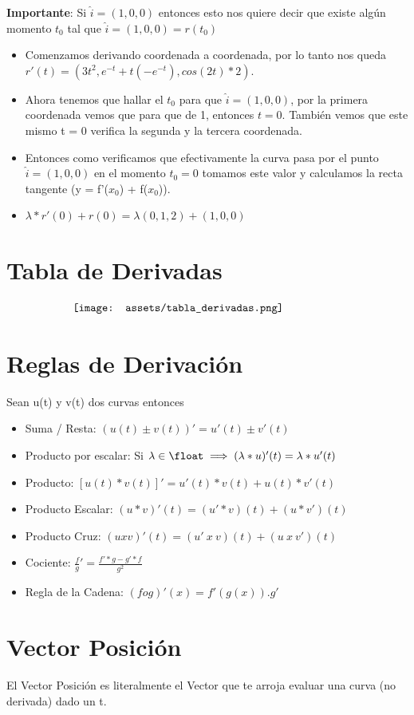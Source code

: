 \documentclass[10pt,a4paper]{article}
\begin{document}
\textbf{Importante}: Si $\hat{i} = (1, 0, 0)$ entonces esto nos quiere decir que existe algún momento $t_{0}$ tal que $ \hat{i} = (1, 0, 0) = r(t_{0})$ 
\begin{itemize}
    \item Comenzamos derivando coordenada a coordenada, por lo tanto nos queda $r'(t) = (3t^{2}, e^{-t} + t (-e^{-t}), cos(2t) * 2)$. 
    \item Ahora tenemos que hallar el $t_{0}$ para que $ \hat{i} = (1, 0, 0)$, por la primera coordenada vemos que para que de 1, entonces $t=0$. También vemos que este mismo t = 0 verifica la segunda y la tercera coordenada.
    \item Entonces como verificamos que efectivamente la curva pasa por el punto $ \hat{i} = (1, 0, 0) $ en el momento $t_{0} = 0$ tomamos este valor y calculamos la recta tangente (y = f'($x_{0}$) + f($x_{0}$)). 
    \item $\lambda * r'(0) + r(0) = \lambda(0, 1, 2) + (1, 0, 0)$
\end{itemize}
\section*{Tabla de Derivadas}
\[\begin{minipage}[b]{0.7\textwidth}
    \texttt{[image: assets/tabla\_derivadas.png]}
\end{minipage}\]
\section*{Reglas de Derivación}
Sean u(t) y v(t) dos curvas entonces 
\begin{itemize}
    \item Suma / Resta: $(u(t) \pm v(t))' = u'(t) \pm v'(t)$
    \item Producto por escalar: Si $\lambda \in \float \implies (\lambda * u)'(t) = \lambda * u'(t)$
    \item Producto: $[u(t) * v(t)]' = u'(t) * v(t) + u(t) * v'(t)$
    \item Producto Escalar: $(u * v)'(t) = (u'*v)(t) + (u * v')(t)$
    \item Producto Cruz: $(u x v)'(t) = (u' \ x \ v)(t) + (u \ x \ v')(t) $
    \item Cociente: $\frac{f}{g}' = \frac{f' * g - g' * f}{g^{2}}$
    \item Regla de la Cadena: $ (f o g)'(x) = f'(g(x)) . g'$
\end{itemize}
\section*{Vector Posición}
El Vector Posición es literalmente el Vector que te arroja evaluar una curva (no derivada) dado un t. 
\end{document}

